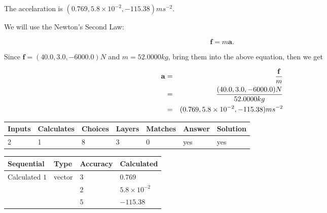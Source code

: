 \documentclass[12pt]{article}
\begin{document}
The accelaration is $  %
(
0.769,
5.8 \times 10^{-2},
-115.38)
ms^{-2} $.
 
 
 
\noindent{}
 
 

 
 
 
\noindent{}
 
 

We will use the Newton's Second Law:
 
\[
\mathbf{f}=m\mathbf{a}.
\]
 
Since $\mathbf{f}= %
(40.0 , 3.0 , -6000.0) N$
and $m= %
52.0000kg$, bring them into the above equation, then we get
 
\begin{eqnarray*}
\mathbf{a}&=&\frac{\mathbf{f}}m  \\
&=&\frac{ %
(40.0 , 3.0 , -6000.0) N}{ %
52.0000kg}  \\
&=& %
(0.769 , 5.8 \times 10^{-2} , -115.38) ms^{-2}
\end{eqnarray*}
 
 
 
\noindent{}
 
 

 
\vspace{0.3in}
   
   
   
   
\noindent\begin{tabular}{|l|l|l|l|l|l|l|}
 \hline
Inputs & Calculates & Choices & Layers & Matches & Answer & Solution \\ \hline
           2  & 
           1  & 
           8
  & 
           3  & 
           0  & 
  yes & 
  yes 
  \\ \hline
 \end{tabular}
   
   
   
   
\noindent{}
   
   
  
  
\noindent\begin{tabular}{|l|l|l|l|}
\hline
 Sequential & Type & Accuracy & Calculated \\ 
\hline
 
 
  Calculated $            1 $ & vector &  
  $            3  $ 
 &  $ 0.769 $ 
 \\    
  & & 
  $            2  $ 
 &  $ 5.8 \times 10^{-2} $ 
 \\    
  & & 
  $            5  $ 
 &  $ -115.38 $ 
 \\  \hline  
 \end{tabular}
   
\end{document}
